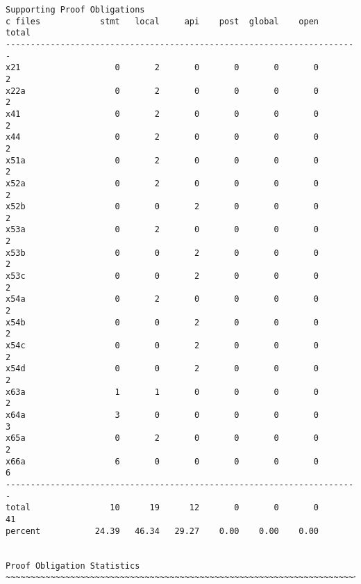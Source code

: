 \documentclass[11pt]{article}
\begin{document}
\begin{small}
\begin{verbatim}
Supporting Proof Obligations
c files            stmt   local     api    post  global    open   total
-----------------------------------------------------------------------
x21                   0       2       0       0       0       0       2
x22a                  0       2       0       0       0       0       2
x41                   0       2       0       0       0       0       2
x44                   0       2       0       0       0       0       2
x51a                  0       2       0       0       0       0       2
x52a                  0       2       0       0       0       0       2
x52b                  0       0       2       0       0       0       2
x53a                  0       2       0       0       0       0       2
x53b                  0       0       2       0       0       0       2
x53c                  0       0       2       0       0       0       2
x54a                  0       2       0       0       0       0       2
x54b                  0       0       2       0       0       0       2
x54c                  0       0       2       0       0       0       2
x54d                  0       0       2       0       0       0       2
x63a                  1       1       0       0       0       0       2
x64a                  3       0       0       0       0       0       3
x65a                  0       2       0       0       0       0       2
x66a                  6       0       0       0       0       0       6
-----------------------------------------------------------------------
total                10      19      12       0       0       0      41
percent           24.39   46.34   29.27    0.00    0.00    0.00


Proof Obligation Statistics
~~~~~~~~~~~~~~~~~~~~~~~~~~~~~~~~~~~~~~~~~~~~~~~~~~~~~~~~~~~~~~~~~~~~~~~~~~~~~~~~


\end{verbatim}
\end{small}
\end{document}
